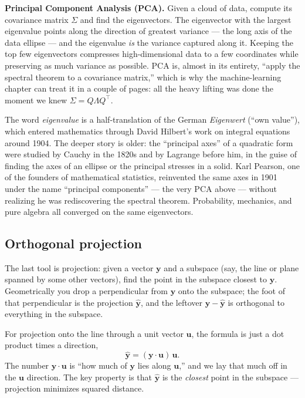 \begin{applicationbox}
\textbf{Principal Component Analysis (PCA).} Given a cloud of data, compute its covariance matrix
$\Sigma$ and find the eigenvectors. The eigenvector with the largest eigenvalue points along the
direction of greatest variance --- the long axis of the data ellipse --- and the eigenvalue \emph{is}
the variance captured along it. Keeping the top few eigenvectors compresses high-dimensional data to a
few coordinates while preserving as much variance as possible. PCA is, almost in its entirety, ``apply
the spectral theorem to a covariance matrix,'' which is why the machine-learning chapter can treat it
in a couple of pages: all the heavy lifting was done the moment we knew $\Sigma=Q\Lambda Q^\top$.
\end{applicationbox}

\begin{historybox}
The word \emph{eigenvalue} is a half-translation of the German \emph{Eigenwert} (``own value''),
which entered mathematics through David Hilbert's work on integral equations around 1904. The deeper
story is older: the ``principal axes'' of a quadratic form were studied by Cauchy in the 1820s and by
Lagrange before him, in the guise of finding the axes of an ellipse or the principal stresses in a
solid. Karl Pearson, one of the founders of mathematical statistics, reinvented the same axes in 1901
under the name ``principal components'' --- the very PCA above --- without realizing he was rediscovering
the spectral theorem. Probability, mechanics, and pure algebra all converged on the same eigenvectors.
\end{historybox}

\subsection{Orthogonal projection}
\label{chAcla:projection}

The last tool is projection: given a vector $\mathbf{y}$ and a subspace (say, the line or plane
spanned by some other vectors), find the point in the subspace closest to $\mathbf{y}$. Geometrically
you drop a perpendicular from $\mathbf{y}$ onto the subspace; the foot of that perpendicular is the
projection $\hat{\mathbf{y}}$, and the leftover $\mathbf{y}-\hat{\mathbf{y}}$ is orthogonal to
everything in the subspace.

For projection onto the line through a unit vector $\mathbf{u}$, the formula is just a dot product
times a direction,
\[
  \hat{\mathbf{y}} = (\mathbf{y}\cdot\mathbf{u})\,\mathbf{u}.
\]
The number $\mathbf{y}\cdot\mathbf{u}$ is ``how much of $\mathbf{y}$ lies along $\mathbf{u}$,'' and we
lay that much off in the $\mathbf{u}$ direction. The key property is that $\hat{\mathbf{y}}$ is the
\emph{closest} point in the subspace --- projection minimizes squared distance.

